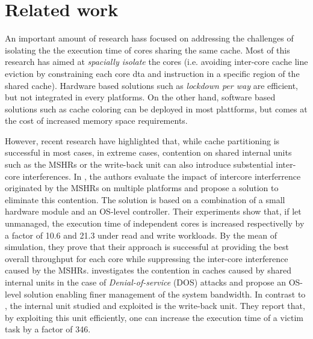 \section{Related work}
    An important amount of research hass focused on addressing the challenges of isolating the the execution time of cores sharing the same cache.
    Most of this research \cite{Mancuso2013RealtimeCM, 6755286} has aimed at \emph{spacially isolate} the cores (i.e. avoiding inter-core cache line eviction by constraining each core dta and instruction in a specific region of the shared cache). Hardware based solutions such as \emph{lockdown per way} \cite{Giovani_cahe_partitioning_survey} are efficient, but not integrated in every platforms.
    On the other hand, software based solutions such as cache coloring \cite{Mancuso2013RealtimeCM} can be deployed in most plattforms, but comes at the cost of increased memory space requirements.

    However, recent research \cite{Valsan2017AddressingIC, Heechul_DDOS_attacks_on_shared_cache} have highlighted that, while cache partitioning is successful in most cases, in extreme cases, contention on shared internal units such as the MSHRs or the write-back unit can also introduce substential inter-core interferences.
    In \cite{Valsan2017AddressingIC}, the authors evaluate the impact of intercore interferrence originated by the MSHRs on multiple platforms and propose a solution to eliminate this contention. The solution is based on a combination of a small hardware module and an OS-level controller.
    Their experiments show that, if let unmanaged, the execution time of independent cores is increased respectivelly by a factor of 10.6 and 21.3 under read and write workloads.
    By the mean of simulation, they prove that their approach is successful at providing the best overall throughput for each core while suppressing the inter-core interference caused by the MSHRs.
    \cite{Heechul_DDOS_attacks_on_shared_cache} investigates the contention in caches caused by shared internal units in the case of \emph{Denial-of-service} (DOS) attacks and propose an OS-level solution enabling finer management of the system bandwidth.
    In contrast to \cite{Valsan2017AddressingIC}, the internal unit studied and exploited is the write-back unit.
    They report that, by exploiting this unit efficiently, one can increase the execution time of a victim task by a factor of 346.
